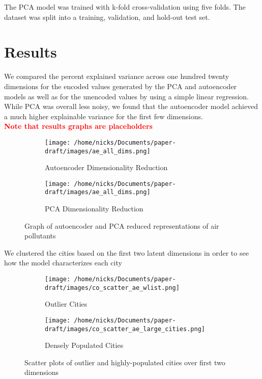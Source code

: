 \documentclass{article}
\newcommand\note[1]{\textbf{\textcolor{red}{#1}}}
\begin{document}
The PCA model was trained with k-fold cross-validation using five folds. The dataset was
split into a training, validation, and hold-out test set.

\section{Results}
We compared the percent explained variance across one hundred twenty dimensions for
the encoded values generated by the PCA and autoencoder models as well as for the unencoded
values by using a simple linear regression. While PCA was overall less noisy, we found that
the autoencoder model achieved a much higher explainable variance for the first few dimensions.
\\ \note{Note that results graphs are placeholders}
\begin{figure}[h!]

\begin{subfigure}{0.5\textwidth}
    \texttt{[image: /home/nicks/Documents/paper-draft/images/ae\_all\_dims.png]} 
    \caption{Autoencoder Dimensionality Reduction}
    \label{fig:ae_dim_reduction}
\end{subfigure}%
\begin{subfigure}{0.5\textwidth}
    \texttt{[image: /home/nicks/Documents/paper-draft/images/ae\_all\_dims.png]}
    \caption{PCA Dimensionality Reduction}
    \label{fig:pca_dim_reduction}
\end{subfigure}

\caption{Graph of autoencoder and PCA reduced representations of air pollutants}
\label{fig:ae_vs_pca}
\end{figure}

\par We clustered the cities based on the first two latent dimensions in order to see how
the model characterizes each city

\begin{figure}[h!]

\begin{subfigure}{0.5\textwidth}
    \texttt{[image: /home/nicks/Documents/paper-draft/images/co\_scatter\_ae\_wlist.png]} 
    \caption{Outlier Cities}
    \label{fig:outliers}
\end{subfigure}%
\begin{subfigure}{0.5\textwidth}
    \texttt{[image: /home/nicks/Documents/paper-draft/images/co\_scatter\_ae\_large\_cities.png]}
    \caption{Densely Populated Cities}
    \label{fig:dense_cities}
\end{subfigure}

\caption{Scatter plots of outlier and highly-populated cities over first two dimensions}
\label{fig:outliers_vs_dense_cities}
\end{figure}
\end{document}
